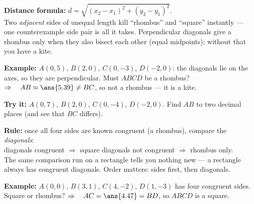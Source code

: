 \documentclass[12pt]{article}
\begin{document}
\begin{formulabox}
\textbf{Distance formula:} $d = \sqrt{(x_2 - x_1)^2 + (y_2 - y_1)^2}$.\\[3pt]
Two \emph{adjacent} sides of unequal length kill ``rhombus'' and ``square'' instantly --- one
counterexample side pair is all it takes. Perpendicular diagonals give a rhombus only when they
also bisect each other (equal midpoints); without that you have a kite.
\end{formulabox}

\begin{examplebox}
\textbf{Example:} $A(0,5)$, $B(2,0)$, $C(0,-3)$, $D(-2,0)$: the diagonals lie on the axes, so they
are perpendicular. Must $ABCD$ be a rhombus?
$\Rightarrow\quad AB \approx \ans{5.39} \neq BC$, so not a rhombus --- it is a kite.
\end{examplebox}

\begin{tryitbox}
\textbf{Try it:} $A(0,7)$, $B(2,0)$, $C(0,-4)$, $D(-2,0)$. Find $AB$ to two decimal places (and see
that $BC$ differs).\\[2pt]
\end{tryitbox}


\begin{formulabox}
\textbf{Rule:} once all four sides are known congruent (a rhombus), compare the \emph{diagonals}:
\\[3pt]
diagonals congruent $\Rightarrow$ square \qquad diagonals not congruent $\Rightarrow$ rhombus only.
\\[2pt]
The same comparison run on a rectangle tells you nothing new --- a rectangle always has congruent
diagonals. Order matters: sides first, then diagonals.
\end{formulabox}

\begin{examplebox}
\textbf{Example:} $A(0,0)$, $B(3,1)$, $C(4,-2)$, $D(1,-3)$ has four congruent sides. Square or
rhombus?
$\Rightarrow\quad AC = \ans{4.47} = BD$, so $ABCD$ is a square.
\end{examplebox}
\end{document}

